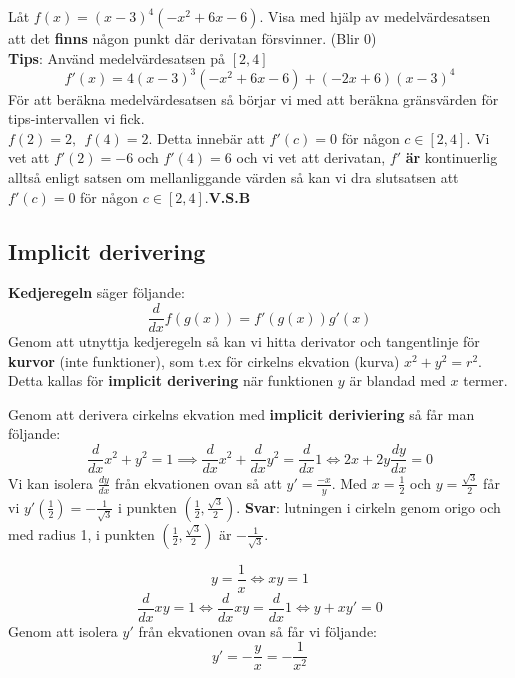 \documentclass{report}
\begin{document}
\pagebreak
\qs{}
{
Låt $ f(x) = (x-3)^4(-x^2+6x-6) $. Visa med hjälp av medelvärdesatsen att det \textbf{finns} någon punkt där derivatan försvinner. (Blir 0)\\
\textbf{Tips}: Använd medelvärdesatsen på $ [2,4] $
}
\sol
\begin{equation*}
f'(x) = 4(x-3)^3(-x^2+6x-6)+(-2x+6)(x-3)^4
\end{equation*}
För att beräkna medelvärdesatsen så börjar vi med att beräkna gränsvärden för tips-intervallen vi fick.\\
$f(2) = 2,\:\:f(4) = 2$. Detta innebär att $ f'(c) = 0 $ för någon $ c \in [2,4] $. Vi vet att $ f'(2) = -6 $ och $ f'(4) = 6 $ och vi vet att derivatan, $ f' $ \textbf{är} kontinuerlig alltså enligt satsen om mellanliggande värden så kan vi dra slutsatsen att $ f'(c) = 0 $ för någon $ c \in [2,4] $.\textbf{V.S.B} 

\vspace{30pt}
\subsection{Implicit derivering}
\textbf{Kedjeregeln} säger följande:
\begin{equation*}
\frac{d}{dx}f(g(x)) = f'(g(x))g'(x)
\end{equation*}
Genom att utnyttja kedjeregeln så kan vi hitta derivator och tangentlinje för \textbf{kurvor} (inte funktioner), som t.ex för cirkelns ekvation (kurva) $ x^2+y^2=r^2 $. Detta kallas för \textbf{implicit derivering} när funktionen $ y $ är blandad med $ x $ termer. 

{
	Genom att derivera cirkelns ekvation med \textbf{implicit deriviering} så får man följande:
\begin{equation*}
\frac{d}{dx} x^2+y^2 = 1 \implies \frac{d}{dx} x^2 + \frac{d}{dx} y^2 = \frac{d}{dx}1 \iff 2x+2y \frac{dy}{dx} = 0
\end{equation*}
Vi kan isolera $ \frac{dy}{dx} $ från ekvationen ovan så att $ y' = \frac{-x}{y}  $. Med $ x = \frac{1}{2}  $ och $ y = \frac{ \sqrt{3} }{2} $ får vi $ y'( \frac{1}{2} ) = - \frac{1}{ \sqrt{3} }  $ i punkten $ ( \frac{1}{2}, \frac{ \sqrt{3} }{2} )$. \textbf{Svar}: lutningen i cirkeln genom origo och med radius 1, i punkten $ ( \frac{1}{2}, \frac{ \sqrt{3} }{2} ) $ är $ - \frac{1}{ \sqrt{3} }  $.    
}

{
\begin{equation*}
y = \frac{1}{x} \iff xy = 1
\end{equation*}
\begin{equation*}
\frac{d}{dx} xy = 1 \iff \frac{d}{dx} xy = \frac{d}{dx} 1 \iff y+xy' = 0
\end{equation*}
Genom att isolera $ y' $ från ekvationen ovan så får vi följande:
\begin{equation*}
y' = - \frac{y}{x} = - \frac{1}{x^2} 
\end{equation*}
}
\end{document}
